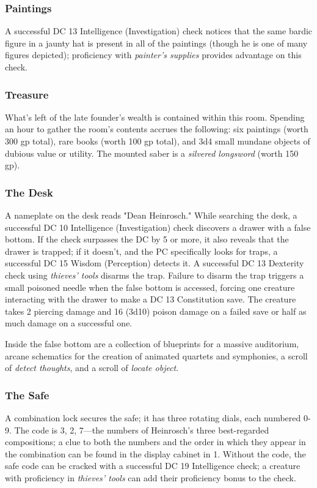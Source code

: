\documentclass[10pt,a4paper,twoside,bg=print,twocolumn,openany,nodeprecatedcode]{dndbook}
\begin{document}
\subsubsection{Paintings}
A successful DC 13 Intelligence (Investigation) check notices that the same bardic figure in a jaunty hat is present in all of the paintings (though he is one of many figures depicted); proficiency with \textit{painter's supplies} provides advantage on this check.

\subsubsection{Treasure}
What's left of the late founder's wealth is contained within this room. Spending an hour to gather the room's contents accrues the following: six paintings (worth 300 gp total), rare books (worth 100 gp total), and 3d4 small mundane objects of dubious value or utility. The mounted saber is a \textit{silvered longsword} (worth 150 gp).

\subsubsection{The Desk}
A nameplate on the desk reads "Dean Heinrosch." While searching the desk, a successful DC 10 Intelligence (Investigation) check discovers a drawer with a false bottom. If the check surpasses the DC by 5 or more, it also reveals that the drawer is trapped; if it doesn't, and the PC specifically looks for traps, a successful DC 15 Wisdom (Perception) detects it. A successful DC 13 Dexterity check using \textit{thieves' tools} disarms the trap. Failure to disarm the trap triggers a small poisoned needle when the false bottom is accessed, forcing one creature interacting with the drawer to make a DC 13 Constitution save. The creature takes 2 piercing damage and 16 (3d10) poison damage on a failed save or half as much damage on a successful one.

Inside the false bottom are a collection of blueprints for a massive auditorium, arcane schematics for the creation of animated quartets and symphonies, a scroll of \textit{detect thoughts}, and a scroll of \textit{locate object}.

\subsubsection{The Safe}
A combination lock secures the safe; it has three rotating dials, each numbered 0-9. The code is 3, 2, 7—the numbers of Heinrosch's three best-regarded compositions; a clue to both the numbers and the order in which they appear in the combination can be found in the display cabinet in 1. Without the code, the safe code can be cracked with a successful DC 19 Intelligence check; a creature with proficiency in \textit{thieves' tools} can add their proficiency bonus to the check.
\end{document}
